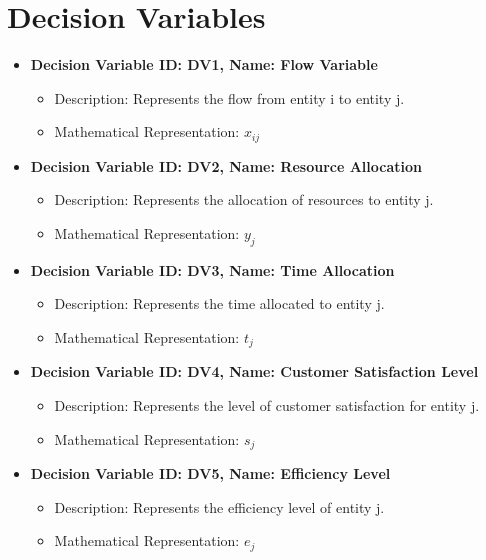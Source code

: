 \documentclass{article}
\begin{document}
\section{Decision Variables}
\begin{itemize}
    \item \textbf{Decision Variable ID: DV1, Name: Flow Variable}
    \begin{itemize}
        \item Description: Represents the flow from entity i to entity j.
        \item Mathematical Representation: $x_{ij}$
    \end{itemize}

    \item \textbf{Decision Variable ID: DV2, Name: Resource Allocation}
    \begin{itemize}
        \item Description: Represents the allocation of resources to entity j.
        \item Mathematical Representation: $y_j$
    \end{itemize}

    \item \textbf{Decision Variable ID: DV3, Name: Time Allocation}
    \begin{itemize}
        \item Description: Represents the time allocated to entity j.
        \item Mathematical Representation: $t_j$
    \end{itemize}

    \item \textbf{Decision Variable ID: DV4, Name: Customer Satisfaction Level}
    \begin{itemize}
        \item Description: Represents the level of customer satisfaction for entity j.
        \item Mathematical Representation: $s_j$
    \end{itemize}

    \item \textbf{Decision Variable ID: DV5, Name: Efficiency Level}
    \begin{itemize}
        \item Description: Represents the efficiency level of entity j.
        \item Mathematical Representation: $e_j$
    \end{itemize}
\end{itemize}
\end{document}

